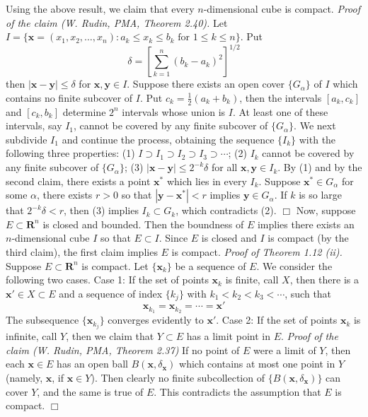 \documentclass[12pt]{article}
\theoremstyle{definition}
\begin{document}
Using the above result, we claim that every $n$-dimensional cube is compact.
\textit{Proof of the claim (W. Rudin, PMA, Theorem 2.40).} Let $I=\{\mathbf{x}=(x_1,x_2,\ldots,x_n):a_k\le x_k\le b_k\mbox{ for }1\le k\le n\}$. Put 
$$
\delta=\left[\sum_{k=1}^n(b_k-a_k)^2\right]^{1/2}
$$
then $\left\vert\mathbf{x}-\mathbf{y}\right\vert\le\delta$ for $\mathbf{x},\mathbf{y}\in I$. Suppose there exists an open cover $\{G_\alpha\}$ of $I$ which contains no finite subcover of $I$. Put $c_k=\frac{1}{2}(a_k+b_k)$, then the intervals $[a_k,c_k]$ and $[c_k,b_k]$ determine $2^n$ intervals whose union is $I$. At least one of these intervals, say $I_1$, cannot be covered by any finite subcover of $\{G_\alpha\}$. We next subdivide $I_1$ and continue the process, obtaining the sequence $\{I_k\}$ with the following three properties:
(1) $I\supset I_1\supset I_2\supset I_3\supset\cdots$;
(2) $I_k$ cannot be covered by any finite subcover of $\{G_\alpha\}$;
(3) $\left\vert\mathbf{x}-\mathbf{y}\right\vert\le 2^{-k}\delta$ for all $\mathbf{x},\mathbf{y}\in I_k$.
By (1) and by the second claim, there exists a point $\mathbf{x}^\ast$ which lies in every $I_k$. Suppose $\mathbf{x}^\ast\in G_\alpha$ for some $\alpha$, there exists $r>0$ so that $\left\vert\mathbf{y}-\mathbf{x}^\ast\right\vert<r$ implies $\mathbf{y}\in G_\alpha$. If $k$ is so large that $2^{-k}\delta<r$, then (3) implies $I_k\subset G_k$, which contradicts (2). $\Box$
Now, suppose $E\subset\mathbf{R}^n$ is closed and bounded. Then the boundness of $E$ implies there exists an $n$-dimensional cube $I$ so that $E\subset I$. Since $E$ is closed and $I$ is compact (by the third claim), the first claim implies $E$ is compact.
\textit{Proof of Theorem 1.12 (ii).} Suppose $E\subset\mathbf{R}^n$ is compact. Let $\{\mathbf{x}_k\}$ be a sequence of $E$. We consider the following two cases.
Case 1: If the set of points $\mathbf{x}_k$ is finite, call $X$, then there is a $\mathbf{x}'\in X\subset E$ and a sequence of index $\{k_j\}$ with $k_1<k_2<k_3<\cdots$, such that
$$
\mathbf{x}_{k_1}=\mathbf{x}_{k_2}=\cdots=\mathbf{x}'
$$
The subsequence $\{\mathbf{x}_{k_j}\}$ converges evidently to $\mathbf{x}'$.
Case 2: If the set of points $\mathbf{x}_k$ is infinite, call $Y$, then we claim that $Y\subset E$ has a limit point in $E$.
\textit{Proof of the claim (W. Rudin, PMA, Theorem 2.37)} If no point of $E$ were a limit of $Y$, then each $\mathbf{x}\in E$ has an open ball $B(\mathbf{x},\delta_{\mathbf{x}})$ which contains at most one point in $Y$ (namely, $\mathbf{x}$, if $\mathbf{x}\in Y$). Then clearly no finite subcollection of $\{B(\mathbf{x},\delta_{\mathbf{x}})\}$ can cover $Y$, and the same is true of $E$. This contradicts the assumption that $E$ is compact. $\Box$
\end{document}
